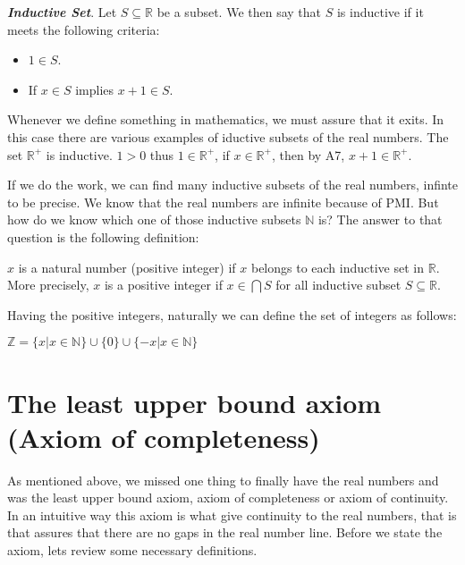 \documentclass{report}
\begin{document}
    \begin{defBox}
        \textit{\textbf{Inductive Set}}. Let $S \subseteq \mathbb{R}$ be a subset. We then say that $S$ is inductive if it meets the following criteria:

        \begin{itemize}
            \item $1 \in S$.
            \item If $x \in S$ implies $x+1 \in S$.
        \end{itemize}
    \end{defBox}

    \begin{noteBox}
        Whenever we define something in mathematics, we must assure that it exits. In this case there are various examples of iductive subsets of the real numbers. The set $\mathbb{R}^+$ is inductive. $1>0$ thus $1 \in \mathbb{R}^+$, if $x \in \mathbb{R}^+$, then by A7, $x+1 \in \mathbb{R}^+$.
    \end{noteBox}

    If we do the work, we can find many inductive subsets of the real numbers, infinte to be precise. We know that the real numbers are infinite because of PMI. But how do we know which one of those inductive subsets $\mathbb{N}$ is? The answer to that question is the following definition:

    \begin{defBox}
        $x$ is a natural number (positive integer) if $x$ belongs to each inductive set in $\mathbb{R}$. More precisely, $x$ is a positive integer if $x \in \bigcap S$ for all inductive subset $S \subseteq \mathbb{R}$.
    \end{defBox}

    Having the positive integers, naturally we can define the set of integers as follows:

    \begin{defBox}
        $\mathbb{Z} = \{x | x \in \mathbb{N}\} \cup \{0\} \cup \{-x | x \in \mathbb{N}\}$
    \end{defBox}

    \section{The least upper bound axiom (Axiom of completeness)}

    As mentioned above, we missed one thing to finally have the real numbers and was the least upper bound axiom, axiom of completeness or axiom of continuity. In an intuitive way this axiom is what give continuity to the real numbers, that is that assures that there are no gaps in the real number line. Before we state the axiom, lets review some necessary definitions.
\end{document}
